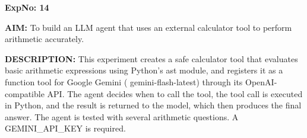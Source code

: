 \documentclass[10pt,a4paper]{article}
\newcommand{\code}[1]{{\ttfamily\hyphenchar\font=-1 #1}}
\begin{document}
\clearpage

\noindent\textbf{ExpNo: 14}

\noindent\textbf{AIM:} To build an LLM agent that uses an external calculator tool to perform arithmetic accurately.

\noindent\textbf{DESCRIPTION:} This experiment creates a safe calculator tool that evaluates basic arithmetic expressions using Python's \code{ast} module, and registers it as a function tool for Google Gemini (\code{gemini{-}\allowbreak{}flash{-}\allowbreak{}latest}) through its OpenAI-compatible API. The agent decides when to call the tool, the tool call is executed in Python, and the result is returned to the model, which then produces the final answer. The agent is tested with several arithmetic questions. A \code{GEMINI\_\allowbreak{}API\_\allowbreak{}KEY} is required.
\end{document}
